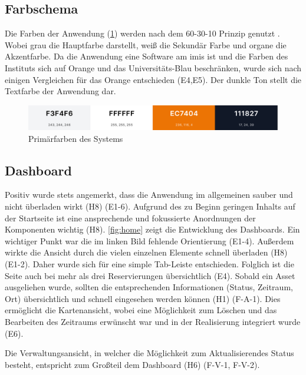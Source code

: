 \subsection{Farbschema}
Die Farben der Anwendung (\ref{fig:farben}) werden nach dem 60-30-10 Prinzip genutzt
\cite{experience_using}. Wobei grau die Hauptfarbe darstellt, weiß die Sekundär Farbe und organe die
Akzentfarbe. Da die Anwendung eine Software am \ac{imis} ist und die Farben des Instituts sich auf
Orange und das Universitäts-Blau beschränken, wurde sich nach einigen Vergleichen für das Orange
entschieden (E4,E5). Der dunkle Ton stellt die Textfarbe der Anwendung dar.
\begin{figure}[h]
    \centering
    \includegraphics[scale=0.23]{Bilder/farben.png}
    \caption[Primärfarben des Systems]{Primärfarben des Systems}
    \label{fig:farben}
\end{figure}

\subsection{Dashboard}
Positiv wurde stets angemerkt, dass die Anwendung im allgemeinen sauber und nicht überladen wirkt (H8)
(E1-6). Aufgrund des zu Beginn geringen Inhalts auf der Startseite ist eine ansprechende und
fokussierte Anordnungen der Komponenten wichtig (H8). \ref{fig:home} zeigt die Entwicklung des
Dashboards. Ein wichtiger Punkt war die im linken Bild fehlende Orientierung (E1-4). Außerdem
wirkte die Ansicht durch die vielen einzelnen Elemente schnell überladen (H8) (E1-2). Daher wurde
sich für eine simple Tab-Leiste entschieden. Folglich ist die Seite auch bei mehr als drei
Reservierungen übersichtlich (E4). Sobald ein Asset ausgeliehen wurde, sollten die entsprechenden
Informationen (Status, Zeitraum, Ort) übersichtlich und schnell eingesehen werden können (H1)
(F-A-1). Dies ermöglicht die Kartenansicht, wobei eine Möglichkeit zum Löschen und das Bearbeiten
des Zeitraums erwünscht war und in der Realisierung integriert wurde (E6).

Die Verwaltungsansicht, in welcher die Möglichkeit zum Aktualisierendes Status besteht, entspricht zum
Großteil dem Dashboard (H6) (F-V-1, F-V-2).


